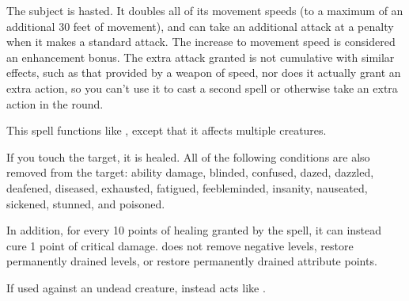 \spelldur{\durshort}
\spelleffect The subject is hasted. It doubles all of its movement speeds (to a maximum of an additional 30 feet of movement), and can take an additional attack at a  penalty when it makes a standard attack. The increase to movement speed is considered an enhancement bonus.
\spellnotes The extra attack granted is not cumulative with similar effects, such as that provided by a weapon of speed, nor does it actually grant an extra action, so you can't use it to cast a second spell or otherwise take an extra action in the round.

\spelleffect This spell functions like , except that it affects multiple creatures.

\spelleffect If you touch the target, it is healed. All of the following conditions are also removed from the target: ability damage, blinded, confused, dazed, dazzled, deafened, diseased, exhausted, fatigued, feebleminded, insanity, nauseated, sickened, stunned, and poisoned.

\par In addition, for every 10 points of healing granted by the spell, it can instead cure 1 point of critical damage.
\spellnotes {} does not remove negative levels, restore permanently drained levels, or restore permanently drained attribute points.
\par If used against an undead creature,  instead acts like .

